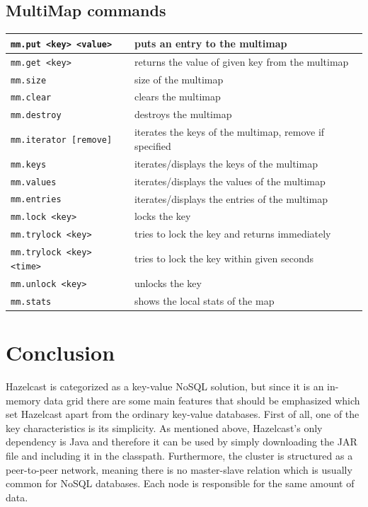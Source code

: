 \subsection*{MultiMap commands}
\begin{tabular}{|p{}|p{}|}
    \hline
    \texttt{mm.put <key> <value>} & puts an entry to the multimap\\\hline
    \texttt{mm.get <key>} & returns the value of given key from the multimap\\\hline
    \texttt{mm.size} & size of the multimap\\\hline
    \texttt{mm.clear} & clears the multimap\\\hline
    \texttt{mm.destroy} & destroys the multimap\\\hline
    \texttt{mm.iterator [remove]} & iterates the keys of the multimap, remove if specified\\\hline
    \texttt{mm.keys} & iterates/displays the keys of the multimap\\\hline
    \texttt{mm.values} & iterates/displays the values of the multimap\\\hline
    \texttt{mm.entries} & iterates/displays the entries of the multimap\\\hline
    \texttt{mm.lock <key>} & locks the key\\\hline
    \texttt{mm.trylock <key>} & tries to lock the key and returns immediately\\\hline
    \texttt{mm.trylock <key> <time>} & tries to lock the key within given seconds\\\hline
    \texttt{mm.unlock <key>} & unlocks the key\\\hline
    \texttt{mm.stats} & shows the local stats of the map\\\hline    
\end{tabular}

\section{Conclusion}

Hazelcast is categorized as a key-value NoSQL solution, but since it is an in-memory data grid there are some main features that should be emphasized which set Hazelcast apart from the ordinary key-value databases.
First of all, one of the key characteristics is its simplicity. As mentioned above, Hazelcast’s only dependency is Java and therefore it can be used by simply downloading the JAR file and including it in the classpath.
Furthermore, the cluster is structured as a peer-to-peer network, meaning there is no master-slave relation which is usually common for NoSQL databases. Each node is responsible for the same amount of data.

